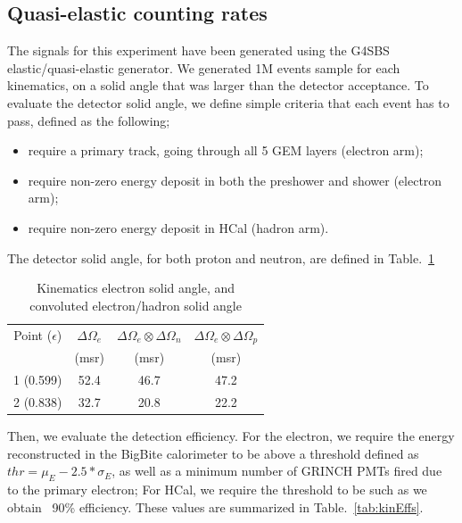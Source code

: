 \subsection{Quasi-elastic counting rates}

The signals for this experiment have been generated using the G4SBS elastic/quasi-elastic generator. 
We generated 1M events sample for each kinematics, on a solid angle that was larger than the detector acceptance.
To evaluate the detector solid angle, we define simple criteria that each event has to pass, defined as the following;
%
\begin{itemize}
\item{require a primary track, going through all 5 GEM layers (electron arm);}
\item{require non-zero energy deposit in both the preshower and shower (electron arm);}
\item{require non-zero energy deposit in HCal (hadron arm).}
\end{itemize}
%
The detector solid angle, for both proton and neutron, are defined in Table.~\ref{tab:kinExpParams}
%
\begin{center}
\begin{table}[h]
\begin{tabular}{|c|c|c|c|}
\hline
Point ($\epsilon$) & $\Delta\Omega_e$ & $\Delta\Omega_e \otimes \Delta\Omega_n$ & $\Delta\Omega_e \otimes \Delta\Omega_p$ \\
 & (msr) & (msr) & (msr) \\
\hline
1 (0.599) & 52.4 & 46.7 & 47.2 \\
\hline
2 (0.838) & 32.7 & 20.8 & 22.2 \\
\hline
\end{tabular} 
\caption{Kinematics electron solid angle, and convoluted electron/hadron solid angle}
\label{tab:kinExpParams}
\end{table}
\end{center}
%
Then, we evaluate the detection efficiency. For the electron, we require the energy reconstructed in the BigBite calorimeter to be above a threshold defined as $thr = \mu_E- 2.5* \sigma_E$, as well as a minimum number of GRINCH PMTs fired due to the primary electron; For HCal, we require the threshold to be such as we obtain ~90\% efficiency. These values are summarized in Table.~\ref{tab:kinEffs}.
